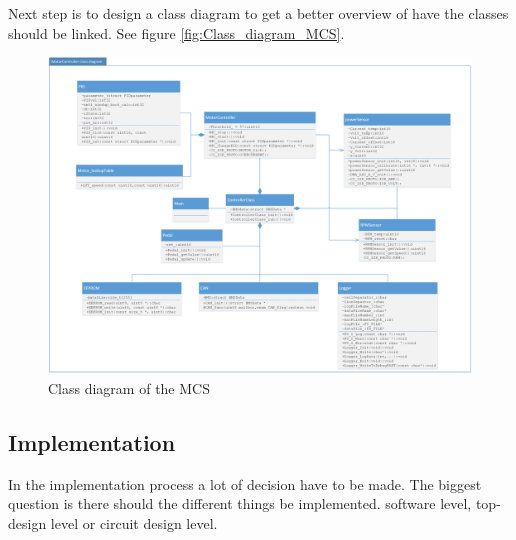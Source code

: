 Next step is to design a class diagram to get a better overview of have the classes should be linked. See figure \vref{fig:Class_diagram_MCS}.

\begin{figure}[H]
	\centering
	\includegraphics [width=6in]{../Documentation_AU2/Software/Pictures/class-diagram.png}
	\caption{Class diagram of the MCS}
	\label{fig:Class_diagram_MCS}
\end{figure}

\subsection{Implementation}

In the implementation process a lot of decision have to be made. The biggest question is there should the different things be implemented. software level, top-design level or circuit design level. \\

